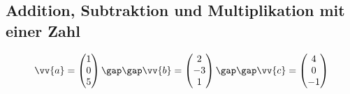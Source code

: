 \subsection{Addition, Subtraktion und Multiplikation mit einer Zahl}
\begin{gather*}
  \vv{a} = \begin{pmatrix}1 \\ 0 \\ 5\end{pmatrix} \gap\gap \vv{b} = \begin{pmatrix}2 \\ -3 \\ 1\end{pmatrix} \gap\gap \vv{c} = \begin{pmatrix}4 \\ 0 \\ -1\end{pmatrix}
\end{gather*}
